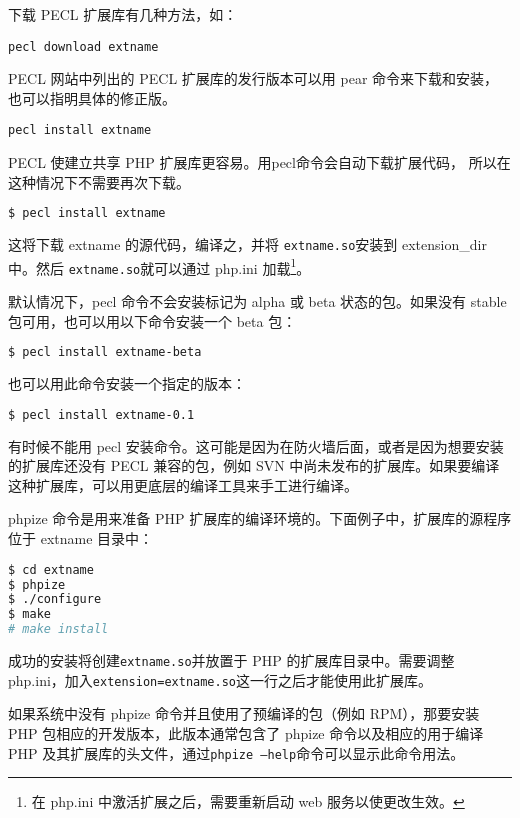 下载 PECL 扩展库有几种方法，如：

\begin{compactitem}
\item \texttt{pecl download extname}

PECL 网站中列出的 PECL 扩展库的发行版本可以用 pear 命令来下载和安装，也可以指明具体的修正版。



\item \texttt{pecl install extname}

PECL 使建立共享 PHP 扩展库更容易。用pecl命令会自动下载扩展代码， 所以在这种情况下不需要再次下载。

\begin{lstlisting}[language=bash]
$ pecl install extname
\end{lstlisting}

这将下载 extname 的源代码，编译之，并将 \texttt{extname.so}安装到 extension\_dir 中。然后 \texttt{extname.so}就可以通过 php.ini 加载\footnote{在 php.ini 中激活扩展之后，需要重新启动 web 服务以使更改生效。}。

默认情况下，pecl 命令不会安装标记为 alpha 或 beta 状态的包。如果没有 stable 包可用，也可以用以下命令安装一个 beta 包：

\begin{lstlisting}[language=bash]
$ pecl install extname-beta
\end{lstlisting}

也可以用此命令安装一个指定的版本：

\begin{lstlisting}[language=bash]
$ pecl install extname-0.1
\end{lstlisting}

有时候不能用 pecl 安装命令。这可能是因为在防火墙后面，或者是因为想要安装的扩展库还没有 PECL 兼容的包，例如 SVN 中尚未发布的扩展库。如果要编译这种扩展库，可以用更底层的编译工具来手工进行编译。

phpize 命令是用来准备 PHP 扩展库的编译环境的。下面例子中，扩展库的源程序位于 extname 目录中：

\begin{lstlisting}[language=bash]
$ cd extname
$ phpize
$ ./configure
$ make
# make install
\end{lstlisting}

成功的安装将创建\texttt{extname.so}并放置于 PHP 的扩展库目录中。需要调整 php.ini，加入\texttt{extension=extname.so}这一行之后才能使用此扩展库。

如果系统中没有 phpize 命令并且使用了预编译的包（例如 RPM），那要安装 PHP 包相应的开发版本，此版本通常包含了 phpize 命令以及相应的用于编译 PHP 及其扩展库的头文件，通过\texttt{phpize --help}命令可以显示此命令用法。


\end{compactitem}
